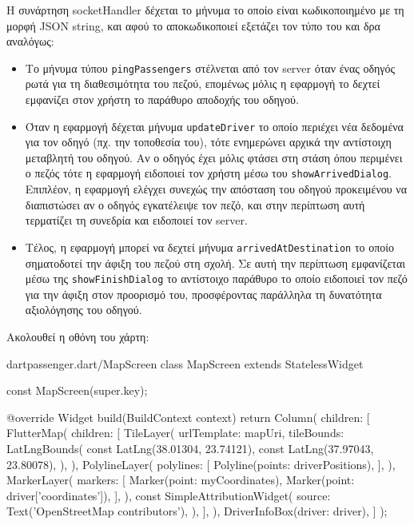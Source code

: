 \documentclass[../thesis.tex]{subfiles}
\begin{document}
Η συνάρτηση socketHandler δέχεται το μήνυμα το οποίο είναι κωδικοποιημένο με τη μορφή JSON string, και αφού το αποκωδικοποιεί εξετάζει τον τύπο του και δρα αναλόγως:

\begin{itemize}
  \item Το μήνυμα τύπου \texttt{pingPassengers} στέλνεται από τον server όταν ένας οδηγός ρωτά για τη διαθεσιμότητα του πεζού, επομένως μόλις η εφαρμογή το δεχτεί εμφανίζει στον χρήστη το παράθυρο αποδοχής του οδηγού.
  \item Όταν η εφαρμογή δέχεται μήνυμα \texttt{updateDriver} το οποίο περιέχει νέα δεδομένα για τον οδηγό (πχ. την τοποθεσία του), τότε ενημερώνει αρχικά την αντίστοιχη μεταβλητή του οδηγού.
  Αν ο οδηγός έχει μόλις φτάσει στη στάση όπου περιμένει ο πεζός τότε η εφαρμογή ειδοποιεί τον χρήστη μέσω του \texttt{showArrivedDialog}.
  Επιπλέον, η εφαρμογή ελέγχει συνεχώς την απόσταση του οδηγού προκειμένου να διαπιστώσει αν ο οδηγός εγκατέλειψε τον πεζό, και στην περίπτωση αυτή τερματίζει τη συνεδρία και ειδοποιεί τον server.
  \item Τέλος, η εφαρμογή μπορεί να δεχτεί μήνυμα \texttt{arrivedAtDestination} το οποίο σηματοδοτεί την άφιξη του πεζού στη σχολή.
  Σε αυτή την περίπτωση εμφανίζεται μέσω της \texttt{showFinishDialog} το αντίστοιχο παράθυρο το οποίο ειδοποιεί τον πεζό για την άφιξη στον προορισμό του, προσφέροντας παράλληλα τη δυνατότητα αξιολόγησης του οδηγού.
\end{itemize}

\bigskip

Ακολουθεί η οθόνη του χάρτη:

\begin{codeblock}{dart}{passenger.dart/MapScreen}
  class MapScreen extends StatelessWidget {
  const MapScreen({super.key});

  @override
  Widget build(BuildContext context) {
    return Column(
      children: [
        FlutterMap(
          children: [
            TileLayer(
              urlTemplate: mapUri,
              tileBounds: LatLngBounds(
                const LatLng(38.01304, 23.74121),
                const LatLng(37.97043, 23.80078),
              ),
            ),
            PolylineLayer(
              polylines: [
                Polyline(points: driverPositions),
              ],
            ),
            MarkerLayer(
              markers: [
                Marker(point: myCoordinates),
                Marker(point: driver['coordinates']), 
              ],
            ),
            const SimpleAttributionWidget(
              source: Text('OpenStreetMap contributors'),
            ),
          ],
        ),
        DriverInfoBox(driver: driver),
      ]
    );
  }
}
\end{codeblock}
\end{document}
